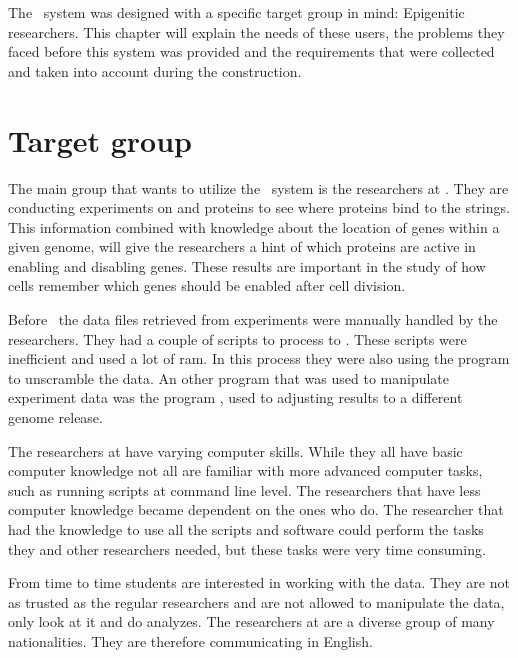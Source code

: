 
The \appName\ system was designed with a specific target group in mind: Epigenitic researchers. This chapter will explain the needs of these users, the problems they faced before this system was provided and the requirements that were collected and taken into account during the construction.

\section{Target group}

The main group that wants to utilize the \appName\ system is the researchers at . They are conducting experiments on  and proteins to see where proteins bind to the  strings. This information combined with knowledge about the location of genes within a given genome, will give the researchers a hint of which proteins are active in enabling and disabling genes. These results are important in the study of how cells remember which genes should be enabled after cell division.

Before \appName\, the data files retrieved from experiments were manually handled by the researchers. They had a couple of  scripts to process  to . These scripts were inefficient and used a lot of ram. In this process they were also using the program  to unscramble the  data. An other program that was used to manipulate experiment data was the program , used to adjusting results to a different genome release.

The researchers at  have varying computer skills. While they all have basic computer knowledge not all are familiar with more advanced computer tasks, such as running scripts at command line level. The researchers that have less computer knowledge became dependent on the ones who do. The researcher that had the knowledge to use all the scripts and software could perform the tasks they and other researchers needed, but these tasks were very time consuming.

From time to time students are interested in working with the data. They are not as trusted as the regular researchers and are not allowed to manipulate the data, only look at it and do analyzes. The researchers at  are a diverse group of many nationalities. They are therefore communicating in English.

